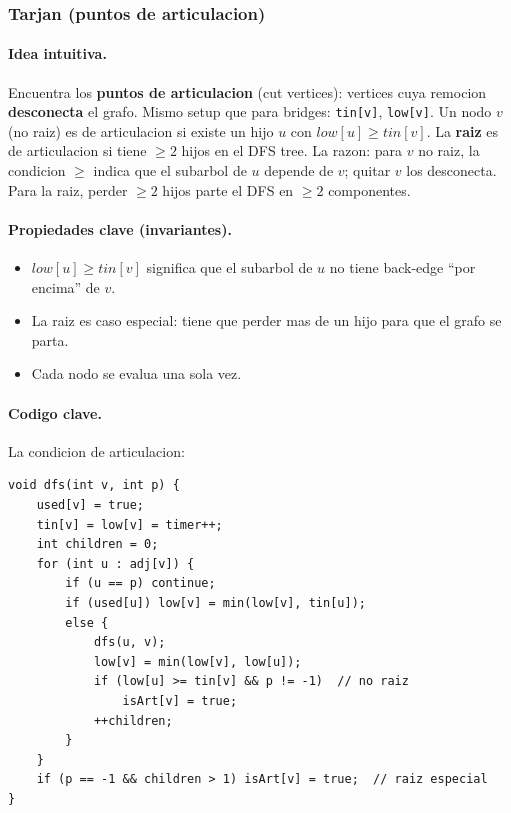 ﻿\subsubsection{Tarjan (puntos de articulacion)}

\paragraph{Idea intuitiva.}
Encuentra los \textbf{puntos de articulacion} (cut vertices): vertices cuya remocion \textbf{desconecta} el grafo. Mismo setup que para bridges: \texttt{tin[v]}, \texttt{low[v]}. Un nodo $v$ (no raiz) es de articulacion si existe un hijo $u$ con $low[u] \ge tin[v]$. La \textbf{raiz} es de articulacion si tiene $\ge 2$ hijos en el DFS tree. La razon: para $v$ no raiz, la condicion $\ge$ indica que el subarbol de $u$ depende de $v$; quitar $v$ los desconecta. Para la raiz, perder $\ge 2$ hijos parte el DFS en $\ge 2$ componentes.

\paragraph{Propiedades clave (invariantes).}
\begin{itemize}\setlength\itemsep{0pt}
	\item $low[u] \ge tin[v]$ significa que el subarbol de $u$ no tiene back-edge ``por encima'' de $v$.
	\item La raiz es caso especial: tiene que perder mas de un hijo para que el grafo se parta.
	\item Cada nodo se evalua una sola vez.
\end{itemize}

\paragraph{Codigo clave.}
La condicion de articulacion:
\begin{verbatim}
void dfs(int v, int p) {
    used[v] = true;
    tin[v] = low[v] = timer++;
    int children = 0;
    for (int u : adj[v]) {
        if (u == p) continue;
        if (used[u]) low[v] = min(low[v], tin[u]);
        else {
            dfs(u, v);
            low[v] = min(low[v], low[u]);
            if (low[u] >= tin[v] && p != -1)  // no raiz
                isArt[v] = true;
            ++children;
        }
    }
    if (p == -1 && children > 1) isArt[v] = true;  // raiz especial
}
\end{verbatim}

